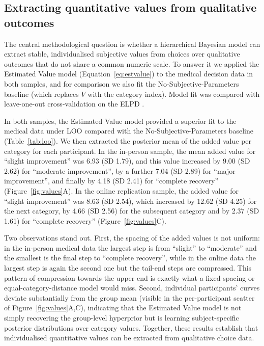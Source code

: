 \documentclass[11pt]{article}
\begin{document}
\subsection{Extracting quantitative values from qualitative outcomes}

The central methodological question is whether a hierarchical Bayesian model can extract stable, individualised subjective values from choices over qualitative outcomes that do not share a common numeric scale. To answer it we applied the Estimated Value model (Equation~\ref{eq:estvalue}) to the medical decision data in both samples, and for comparison we also fit the No-Subjective-Parameters baseline (which replaces $V$ with the category index). Model fit was compared with leave-one-out cross-validation on the ELPD \citep{vehtari2017loo}.

In both samples, the Estimated Value model provided a superior fit to the medical data under LOO compared with the No-Subjective-Parameters baseline (Table~\ref{tab:loo}). We then extracted the posterior mean of the added value per category for each participant. In the in-person sample, the mean added value for ``slight improvement'' was 6.93 (SD 1.79), and this value increased by 9.00 (SD 2.62) for ``moderate improvement'', by a further 7.04 (SD 2.89) for ``major improvement'', and finally by 4.18 (SD 2.41) for ``complete recovery'' (Figure~\ref{fig:values}A). In the online replication sample, the added value for ``slight improvement'' was 8.63 (SD 2.54), which increased by 12.62 (SD 4.25) for the next category, by 4.66 (SD 2.56) for the subsequent category and by 2.37 (SD 1.61) for ``complete recovery'' (Figure~\ref{fig:values}C).

Two observations stand out. First, the spacing of the added values is not uniform: in the in-person medical data the largest step is from ``slight'' to ``moderate'' and the smallest is the final step to ``complete recovery'', while in the online data the largest step is again the second one but the tail-end steps are compressed. This pattern of compression towards the upper end is exactly what a fixed-spacing or equal-category-distance model would miss. Second, individual participants' curves deviate substantially from the group mean (visible in the per-participant scatter of Figure~\ref{fig:values}A,C), indicating that the Estimated Value model is not simply recovering the group-level hyperprior but is learning subject-specific posterior distributions over category values. Together, these results establish that individualised quantitative values can be extracted from qualitative choice data.
\end{document}
